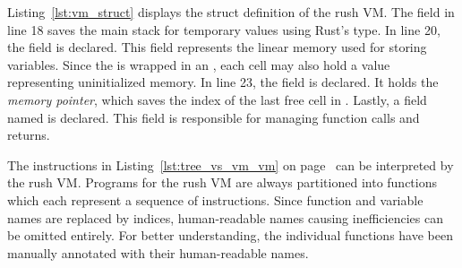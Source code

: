 
Listing~\ref{lst:vm_struct} displays the struct definition of the rush VM\@.
The  field in line 18 saves the main stack for temporary values using Rust's  type.
In line 20, the  field is declared.
This field represents the linear memory used for storing variables.
Since the  is wrapped in an , each cell may also hold a  value representing uninitialized memory.
In line 23, the  field is declared.
It holds the \emph{memory pointer}, which saves the index of the last free cell in .
Lastly, a field named  is declared.
This field is responsible for managing function calls and returns.

The instructions in Listing~\ref{lst:tree_vs_vm_vm} on page~\pageref{lst:tree_vs_vm_vm} can be interpreted by the rush VM\@.
Programs for the rush VM are always partitioned into functions which each represent a sequence of instructions.
Since function and variable names are replaced by indices, human-readable names causing inefficiencies can be omitted entirely.
For better understanding, the individual functions have been manually annotated with their human-readable names.

